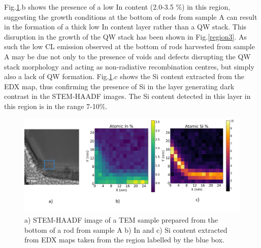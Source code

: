  
Fig.\ref{AbotEDX}.b shows the presence of a low In content (2.0-3.5 \%) in this region, suggesting the growth conditions at the bottom of rods from sample A can result in the formation of a thick low In content layer rather than a QW stack. This disruption in the growth of the QW stack has been shown in Fig.\ref{region3}. As such the low CL emission observed at the bottom of rods harvested from sample A may be due not only to the presence of voids and defects disrupting the QW stack morphology and acting as non-radiative recombination centres, but simply also a lack of QW formation. Fig.\ref{AbotEDX}.c shows the Si content extracted from the EDX map, thus confirming the presence of Si in the layer generating dark contrast in the STEM-HAADF images. The Si content detected in this layer in this region is in the range 7-10\%.

\begin{figure}[h]
	\centering
	\includegraphics[width=1\textwidth]{Figs/Ch6/A-bot-EDX}
	\caption{a) STEM-HAADF image of a TEM sample prepared from the bottom of a rod from sample A b) In and c) Si content extracted from EDX maps taken from the region labelled by the blue box.}
	\label{AbotEDX}
\end{figure}
\FloatBarrier

